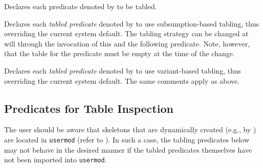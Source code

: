 \begin{description}

%
Declares each predicate denoted by  to be tabled.


%
Declares each \emph{tabled predicate} denoted by 
to use subsumption-based tabling, thus overriding the current system
default.  The tabling strategy can be changed at will through the
invocation of this and the following predicate.  Note, however, that
the table for the predicate must be empty at the time of the change.


%
Declares each \emph{tabled predicate} denoted by 
to use variant-based tabling, thus overriding the current system
default.  The same comments apply as above.

\end{description}


\subsection{Predicates for Table Inspection}
\label{sec:TablePred:Inspection}

The user should be aware that skeletons that are dynamically created
(e.g., by ) are located in {\tt usermod} (refer to
).  In such a case, the tabling predicates below may
not behave in the desired manner if the tabled predicates themselves
have not been imported into {\tt usermod}.

